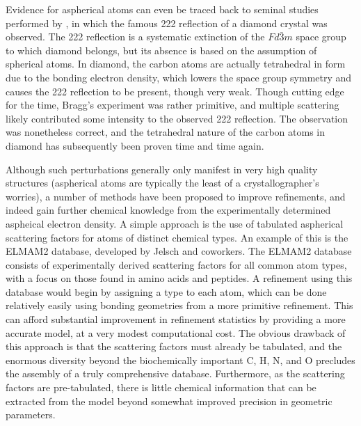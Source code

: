 \begin{refsection}
Evidence for aspherical atoms can even be traced back to seminal studies performed by \citeauthor{Bragg1920}, in which the famous 222 reflection of a diamond crystal was observed.
The 222 reflection is a systematic extinction of the $Fd\bar{3}m$ space group to which diamond belongs, but its absence is based on the assumption of spherical atoms.
In diamond, the carbon atoms are actually tetrahedral in form due to the bonding electron density, which lowers the space group symmetry and causes the 222 reflection to be present, though very weak.\autocite{Bragg1920}
Though cutting edge for the time, Bragg's experiment was rather primitive, and multiple scattering likely contributed some intensity to the observed 222 reflection.
The observation was nonetheless correct, and the tetrahedral nature of the carbon atoms in diamond has subsequently been proven time and time again.

Although such perturbations generally only manifest in very high quality structures (aspherical atoms are typically the least of a crystallographer's worries), a number of methods have been proposed to improve refinements, and indeed gain further chemical knowledge from the experimentally determined aspheical electron density.
A simple approach is the use of tabulated aspherical scattering factors for atoms of distinct chemical types.
An example of this is the ELMAM2 database, developed by Jelsch and coworkers.\autocite{Domagaa2012}
The ELMAM2 database consists of experimentally derived scattering factors for all common atom types, with a focus on those found in amino acids and peptides.
A refinement using this database would begin by assigning a type to each atom, which can be done relatively easily using bonding geometries from a more primitive refinement.
This can afford substantial improvement in refinement statistics by providing a more accurate model, at a very modest computational cost.
The obvious drawback of this approach is that the scattering factors must already be tabulated, and the enormous diversity beyond the biochemically important C, H, N, and O precludes the assembly of a truly comprehensive database.
Furthermore, as the scattering factors are pre-tabulated, there is little chemical information that can be extracted from the model beyond somewhat improved precision in geometric parameters.


\end{refsection}
